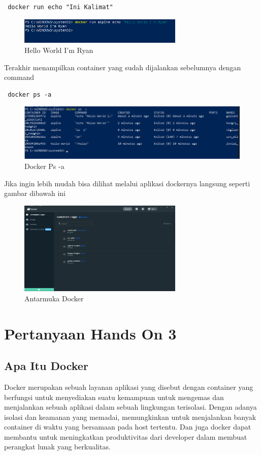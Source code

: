 \documentclass[11pt,a4paper]{article}
\begin{document}
  \begin{lstlisting}
 docker run echo "Ini Kalimat"\end{lstlisting}
 \begin{figure}[h]
     \centering
     \includegraphics[width=0.7\textwidth]{Figure/10. helloworld.png}
     \caption{Hello World I'm Ryan}
 \end{figure}
 Terakhir menampilkan container yang sudah dijalankan sebelumnya dengan command
 \begin{lstlisting}
 docker ps -a\end{lstlisting}
 \begin{figure}[h]
     \centering
     \includegraphics[width=1\textwidth]{Figure/11. perintah yang dah pernah.png}
     \caption{Docker Ps -a}
 \end{figure}
 Jika ingin lebih mudah bisa dilihat melalui aplikasi dockernya langsung seperti gambar dibawah ini
 \begin{figure}[h]
     \centering
     \includegraphics[width=0.7\textwidth]{Figure/12. docker.png}
     \caption{Antarmuka Docker}
 \end{figure}
 
 \section{Pertanyaan Hands On 3}
\subsection{Apa Itu Docker}
Docker merupakan sebuah layanan aplikasi yang disebut dengan container yang berfungsi untuk menyediakan suatu kemampuan untuk mengemas dan menjalankan sebuah aplikasi dalam sebuah lingkungan terisolasi. Dengan adanya isolasi dan keamanan yang memadai, memungkinkan  untuk menjalankan banyak container di waktu yang bersamaan pada host tertentu. Dan juga docker dapat membantu untuk meningkatkan produktivitas dari developer dalam membuat perangkat lunak yang berkualitas\cite{dewaweb}.
\end{document}
